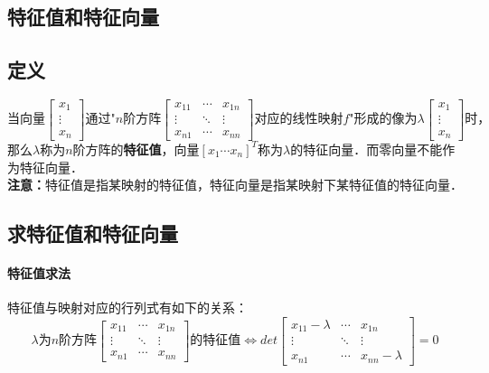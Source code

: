 \documentclass[12pt]{article}
\begin{document}
\begin{CJK}{UTF8}{gbsn}
\section{特征值和特征向量}
\subsection{定义}
\begin{equation}
\text{当向量}
\left[
\begin{array}{c}
x_1\\
\vdots\\
x_n
\end{array}
\right]
\text{通过"}n\text{阶方阵}
\left[
\begin{array}{ccc}
x_{11} & \cdots & x_{1n}\\
\vdots & \ddots & \vdots\\
x_{n1} & \cdots & x_{nn}
\end{array}
\right]
\text{对应的线性映射}f\text{"形成的像为}
\lambda\left[
\begin{array}{c}
x_1\\
\vdots\\
x_n
\end{array}
\right]
\text{时，} 
\end{equation}
那么$\lambda$称为$n$阶方阵的\textbf{特征值}，向量$[x_1\cdots x_n]^T$称为$\lambda$的特征向量．而零向量不能作为特征向量．\\
\textbf{注意：}特征值是指某映射的特征值，特征向量是指某映射下某特征值的特征向量．
\subsection{求特征值和特征向量}
\paragraph{特征值求法}
特征值与映射对应的行列式有如下的关系：
\begin{equation}
\lambda\text{为}n\text{阶方阵}\left[
\begin{array}{ccc}
x_{11} & \cdots & x_{1n}\\
\vdots & \ddots & \vdots\\
x_{n1} & \cdots & x_{nn}
\end{array}
\right]\text{的特征值}
\Leftrightarrow
det
\left[
\begin{array}{ccc}
x_{11}-\lambda & \cdots & x_{1n}\\
\vdots & \ddots & \vdots\\
x_{n1} & \cdots & x_{nn}-\lambda
\end{array}
\right]=0
\end{equation}

\end{CJK}
\end{document}

